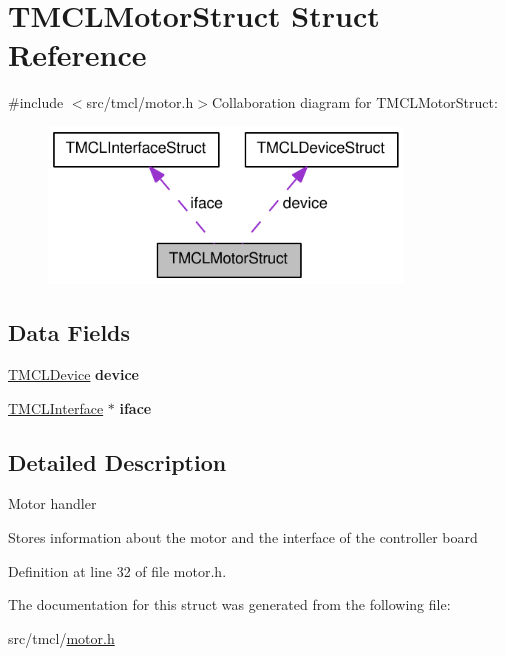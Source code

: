\hypertarget{structTMCLMotorStruct}{
\section{TMCLMotorStruct Struct Reference}
\label{structTMCLMotorStruct}
}


{\ttfamily \#include $<$src/tmcl/motor.h$>$}Collaboration diagram for TMCLMotorStruct:\nopagebreak
\begin{figure}[H]
\begin{center}
\leavevmode
\includegraphics[width=266pt]{structTMCLMotorStruct__coll__graph}
\end{center}
\end{figure}
\subsection*{Data Fields}
\begin{DoxyCompactItemize}
\item 
\hypertarget{structTMCLMotorStruct_a035fa87a12ac1eb2cd585273080c3951}{
\hyperlink{structTMCLDeviceStruct}{TMCLDevice} {\bfseries device}}
\label{structTMCLMotorStruct_a035fa87a12ac1eb2cd585273080c3951}

\item 
\hypertarget{structTMCLMotorStruct_ae6d556412ee1450882d073678811e753}{
\hyperlink{structTMCLInterfaceStruct}{TMCLInterface} $\ast$ {\bfseries iface}}
\label{structTMCLMotorStruct_ae6d556412ee1450882d073678811e753}

\end{DoxyCompactItemize}


\subsection{Detailed Description}
Motor handler

Stores information about the motor and the interface of the controller board 

Definition at line 32 of file motor.h.

The documentation for this struct was generated from the following file:\begin{DoxyCompactItemize}
\item 
src/tmcl/\hyperlink{motor_8h}{motor.h}\end{DoxyCompactItemize}

